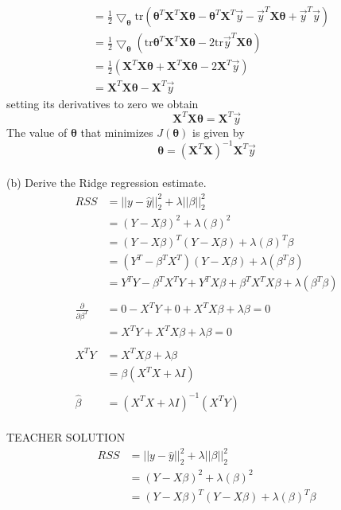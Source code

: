 \documentclass[draft]{exam} %
\theoremstyle{definition} \newtheorem*{defn}{Definition}
\begin{document}
\begin{questions}
\begin{solution}
\begin{align}
&= \frac{1}{2}\bigtriangledown_{\pmb{\theta}}
\text{tr}(\pmb{\theta}^T\pmb{X}^T\pmb{X}\pmb{\theta} -
\pmb{\theta}^T\pmb{X}^T \vec{y} -
\vec{y}^T \pmb{X}\pmb{\theta} +
\vec{y}^T \vec{y})\\
&= \frac{1}{2}\bigtriangledown_{\pmb{\theta}}
(\text{tr}\pmb{\theta}^T\pmb{X}^T\pmb{X}\pmb{\theta} -
2\text{tr} \vec{y}^T \pmb{X}\pmb{\theta}) \\
&= \frac{1}{2}(\pmb{X}^T\pmb{X}\pmb{\theta} +
\pmb{X}^T\pmb{X}\pmb{\theta} -
2 \pmb{X}^T\vec{y})\\
&= \pmb{X}^T\pmb{X} \pmb{\theta} - \pmb{X}^T \vec{y}
\end{align}
setting its derivatives to zero we obtain 
\[\pmb{X}^T\pmb{X} \pmb{\theta} = \pmb{X}^T \vec{y} \]
The value of $\pmb{\theta}$ that minimizes $J(\pmb{\theta})$ is given by
\[\pmb{\theta} = (\pmb{X}^T\pmb{X})^{-1} \pmb{X}^T \vec{y} \]\\
(b) Derive the Ridge regression estimate. \\
\begin{align*}
RSS & = ||y-\hat{y}||_2^2 + \lambda || \beta ||_2^2 \\
& = ( Y - X \beta )^2 + \lambda(\beta)^2 \\
& = ( Y - X \beta )^T ( Y - X \beta ) + \lambda ( \beta )^T \beta \\
& = ( Y^T - \beta^T X^T )( Y - X \beta ) + \lambda( \beta^T \beta ) \\
& = Y^T Y - \beta^T X^T Y + Y^T X \beta + \beta^T X^T X \beta + \lambda ( \beta^T \beta ) \\\\
\frac{\partial}{\partial \beta^T} & = 0 - X^T Y + 0 + X^T X \beta + \lambda \beta = 0 \\
& = X^T Y + X^T X \beta + \lambda \beta = 0 \\\\
X^T Y & = X^T X \beta + \lambda \beta \\
& = \beta ( X^T X + \lambda I ) \\\\
\hat{\beta} & = ( X^T X + \lambda I )^{-1}( X^T Y )  
\end{align*}
\\
TEACHER SOLUTION\\
\begin{align*}
RSS & = ||y-\hat{y}||_2^2 + \lambda || \beta ||_2^2 \\
& = ( Y - X \beta )^2 + \lambda(\beta)^2 \\
& = ( Y - X \beta )^T ( Y - X \beta ) + \lambda ( \beta )^T \beta \\

\end{align*}
\end{solution}
\end{questions}
\end{document}
